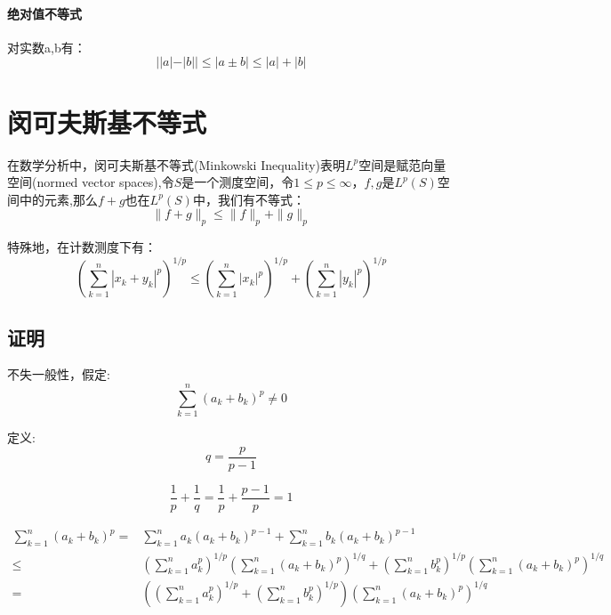 \documentclass[a4paper]{article} %
\numberwithin{equation}{section} %
\begin{document}
\paragraph{绝对值不等式}
对实数a,b有：
\begin{equation}
||a|-|b||\le |a\pm b|\le|a|+|b|
\end{equation}



\section{闵可夫斯基不等式}

在数学分析中，闵可夫斯基不等式(Minkowski Inequality)表明$L^p$空间是赋范向量空间(normed vector spaces),令$S$是一个测度空间，令$1\le p\le \infty$，$f,g$是$L^p(S)$空间中的元素,那么$f+g$也在$L^p(S)$中，我们有不等式：
\begin{equation}
\|f+g\|_p\le\|f\|_p+\|g\|_p
\end{equation}

特殊地，在计数测度下有：
\begin{equation}
\left(\sum_{k=1}^n|x_k+y_k|^p\right)^{1/p}\le\left(\sum_{k=1}^n|x_k|^p\right)^{1/p}+
\left(\sum_{k=1}^n|y_k|^p\right)^{1/p}
\end{equation}

\subsection{证明}
不失一般性，假定:
\begin{equation}
\sum_{k=1}^n(a_k+b_k)^p\neq 0
\end{equation}

定义:
$$
q=\frac{p}{p-1}
$$

\begin{equation}
\frac{1}{p}+\frac{1}{q}=\frac{1}{p}+\frac{p-1}{p}=1
\end{equation}

\begin{align}
\sum_{k=1}^n(a_k+b_k)^p
=&\sum_{k=1}^na_k(a_k+b_k)^{p-1}+\sum_{k=1}^nb_k(a_k+b_k)^{p-1} \\
\le& \left(\sum_{k=1}^n a_k^p\right)^{1/p}\left(\sum_{k=1}^n (a_k+b_k)^p\right)^{1/q}+\left(\sum_{k=1}^n b_k^p\right)^{1/p}\left(\sum_{k=1}^n (a_k+b_k)^p\right)^{1/q} \\
=&\left(\left(\sum_{k=1}^n a_k^p\right)^{1/p}+\left(\sum_{k=1}^n b_k^p\right)^{1/p}\right)\left(\sum_{k=1}^n(a_k+b_k)^p\right)^{1/q}
\end{align}
\end{document}
